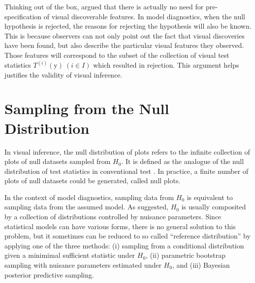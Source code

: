 \documentclass{monashthesis}
\theoremstyle{definition}
\theoremstyle{definition}
\theoremstyle{definition}
\theoremstyle{definition}
\theoremstyle{remark}
\begin{document}
Thinking out of the box, \textcite{buja_statistical_2009} argued that there is actually no need for pre-specification of visual discoverable features. In model diagnostics, when the null hypothesis is rejected, the reasons for rejecting the hypothesis will also be known. This is because observers can not only point out the fact that visual discoveries have been found, but also describe the particular visual features they observed. Those features will correspond to the subset of the collection of visual test statistics \(T^{(i)}(\boldsymbol{\mathrm{y}})~(i \in I)\) which resulted in rejection. This argument helps justifies the validity of visual inference.

\hypertarget{sampling-from-the-null-distribution}{%
\section{Sampling from the Null Distribution}\label{sampling-from-the-null-distribution}}

In visual inference, the null distribution of plots refers to the infinite collection of plots of null datasets sampled from \(H_0\). It is defined as the analogue of the null distribution of test statistics in conventional test \autocite{buja_statistical_2009}. In practice, a finite number of plots of null datasets could be generated, called null plots.

In the context of model diagnostics, sampling data from \(H_0\) is equivalent to sampling data from the assumed model. As \textcite{buja_statistical_2009} suggested, \(H_0\) is usually composited by a collection of distributions controlled by nuisance parameters. Since statistical models can have various forms, there is no general solution to this problem, but it sometimes can be reduced to so called ``reference distribution'' by applying one of the three methods: (i) sampling from a conditional distribution given a minimimal sufficient statistic under \(H_0\), (ii) parametric bootstrap sampling with nuisance parameters estimated under \(H_0\), and (iii) Bayesian posterior predictive sampling.
\end{document}
